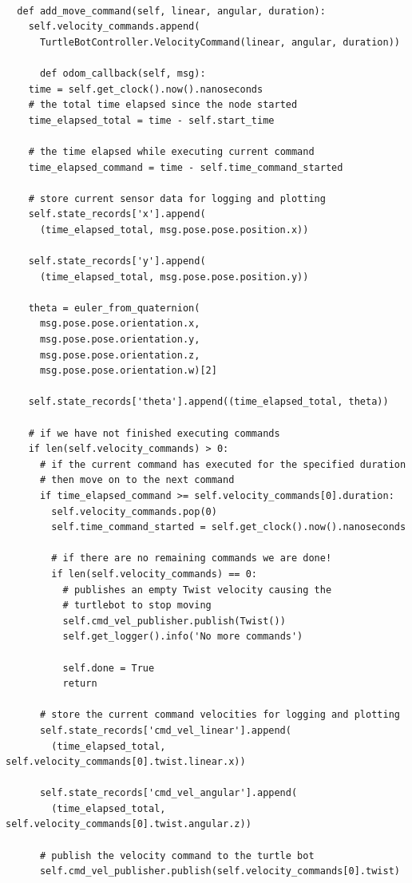 \documentclass{article}
\begin{document}
\begin{verbatim}
  
  def add_move_command(self, linear, angular, duration):
    self.velocity_commands.append(
      TurtleBotController.VelocityCommand(linear, angular, duration))
      
      def odom_callback(self, msg):
    time = self.get_clock().now().nanoseconds
    # the total time elapsed since the node started
    time_elapsed_total = time - self.start_time

    # the time elapsed while executing current command
    time_elapsed_command = time - self.time_command_started

    # store current sensor data for logging and plotting
    self.state_records['x'].append(
      (time_elapsed_total, msg.pose.pose.position.x))

    self.state_records['y'].append(
      (time_elapsed_total, msg.pose.pose.position.y))

    theta = euler_from_quaternion(
      msg.pose.pose.orientation.x,
      msg.pose.pose.orientation.y,
      msg.pose.pose.orientation.z,
      msg.pose.pose.orientation.w)[2]
    
    self.state_records['theta'].append((time_elapsed_total, theta))

    # if we have not finished executing commands
    if len(self.velocity_commands) > 0:
      # if the current command has executed for the specified duration
      # then move on to the next command
      if time_elapsed_command >= self.velocity_commands[0].duration:
        self.velocity_commands.pop(0)
        self.time_command_started = self.get_clock().now().nanoseconds

        # if there are no remaining commands we are done!
        if len(self.velocity_commands) == 0:
          # publishes an empty Twist velocity causing the 
          # turtlebot to stop moving
          self.cmd_vel_publisher.publish(Twist())
          self.get_logger().info('No more commands')

          self.done = True
          return
      
      # store the current command velocities for logging and plotting
      self.state_records['cmd_vel_linear'].append(
        (time_elapsed_total, self.velocity_commands[0].twist.linear.x))
      
      self.state_records['cmd_vel_angular'].append(
        (time_elapsed_total, self.velocity_commands[0].twist.angular.z))
      
      # publish the velocity command to the turtle bot
      self.cmd_vel_publisher.publish(self.velocity_commands[0].twist)


\end{verbatim}
\end{document}
